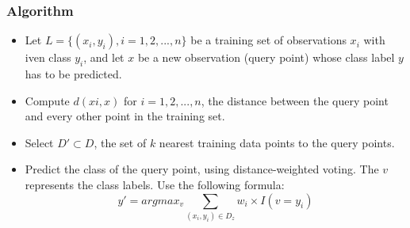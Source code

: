 \subsubsection{Algorithm}
\begin{itemize}
    \item
    Let \(L=\{(x_i,y_i), i=1,2,...,n\}\) be a training set of observations \(x_i\) with iven class \(y_i\), and let \(x\) be a new observation (query point) whose class label \(y\) has to be predicted.
    \item
    Compute \(d(xi,x)\) for \(i=1,2,...,n\), the distance between the query point and every other point in the training set.
    \item
    Select \(D' \subset D\), the set of \(k\) nearest training data points to the query points.
    \item
    Predict the class of the query point, using distance-weighted voting. The \(v\) represents the class labels. Use the following formula:
    \begin{equation}
        y'=argmax_v \sum_{(x_i,y_i) \in D_z}w_i \times I(v=y_i)
    \end{equation}
\end{itemize}

